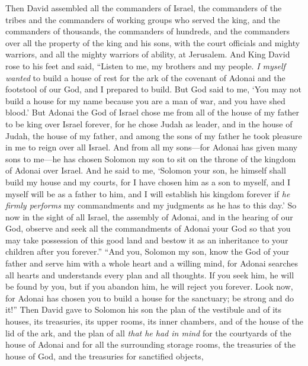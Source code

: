 \begin{biblechapter} %
 Then David assembled all the commanders of Israel, the commanders of the tribes and the commanders of working groups who served the king, and the commanders of thousands, the commanders of hundreds, and the commanders over all the property of the king and his sons, with the court officials and mighty warriors, and all the mighty warriors of ability, at Jerusalem.
\verse And King David rose to his feet and said, “Listen to me, my brothers and my people. \textit{I myself wanted} to build a house of rest for the ark of the covenant of Adonai and the footstool of our God, and I prepared to build.
\verse But God said to me, ‘You may not build a house for my name because you are a man of war, and you have shed blood.’
\verse But Adonai the God of Israel chose me from all of the house of my father to be king over Israel forever, for he chose Judah as leader, and in the house of Judah, the house of my father, and among the sons of my father he took pleasure in me to reign over all Israel.
\verse And from all my sons—for Adonai has given many sons to me—he has chosen Solomon my son to sit on the throne of the kingdom of Adonai over Israel.
\verse And he said to me, ‘Solomon your son, he himself shall build my house and my courts, for I have chosen him as a son to myself, and I myself will be as a father to him,
\verse and I will establish his kingdom forever if \textit{he firmly performs} my commandments and my judgments as he has to this day.’
\verse So now in the sight of all Israel, the assembly of Adonai, and in the hearing of our God, observe and seek all the commandments of Adonai your God so that you may take possession of this good land and bestow it as an inheritance to your children after you forever.”
 “And you, Solomon my son, know the God of your father and serve him with a whole heart and a willing mind, for Adonai searches all hearts and understands every plan and all thoughts. If you seek him, he will be found by you, but if you abandon him, he will reject you forever.
\verse Look now, for Adonai has chosen you to build a house for the sanctuary; be strong and do it!”
\verse Then David gave to Solomon his son the plan of the vestibule and of its houses, its treasuries, its upper rooms, its inner chambers, and of the house of the lid of the ark,
\verse and the plan of all \textit{that he had in mind} for the courtyards of the house of Adonai and for all the surrounding storage rooms, the treasuries of the house of God, and the treasuries for sanctified objects,

\end{biblechapter}
